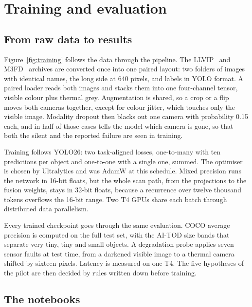 \chapter{Training and evaluation}

\section{From raw data to results}

Figure~\ref{fig:training} follows the data through the pipeline. The LLVIP~\cite{jia2021llvip} and
M3FD~\cite{liu2022tardal} archives are converted once into one paired layout: two folders of images with identical
names, the long side at 640 pixels, and labels in YOLO format. A paired loader reads both images and stacks them
into one four-channel tensor, visible colour plus thermal grey. Augmentation is shared, so a crop or a flip moves
both cameras together, except for colour jitter, which touches only the visible image. Modality dropout then blacks
out one camera with probability 0.15 each, and in half of those cases tells the model which camera is gone, so that
both the silent and the reported failure are seen in training.


Training follows YOLO26: two task-aligned losses, one-to-many with ten predictions per object and one-to-one with a
single one, summed. The optimiser is chosen by Ultralytics and was AdamW at this schedule. Mixed precision runs the
network in 16-bit floats, but the whole scan path, from the projections to the fusion weights, stays in 32-bit
floats, because a recurrence over twelve thousand tokens overflows the 16-bit range. Two T4 GPUs share each batch
through distributed data parallelism.

Every trained checkpoint goes through the same evaluation. COCO average precision is computed on the full test
set, with the AI-TOD size bands that separate very tiny, tiny and small objects. A degradation probe applies seven
sensor faults at test time, from a darkened visible image to a thermal camera shifted by sixteen pixels. Latency is
measured on one T4. The five hypotheses of the pilot are then decided by rules written down before training.

\section{The notebooks}


